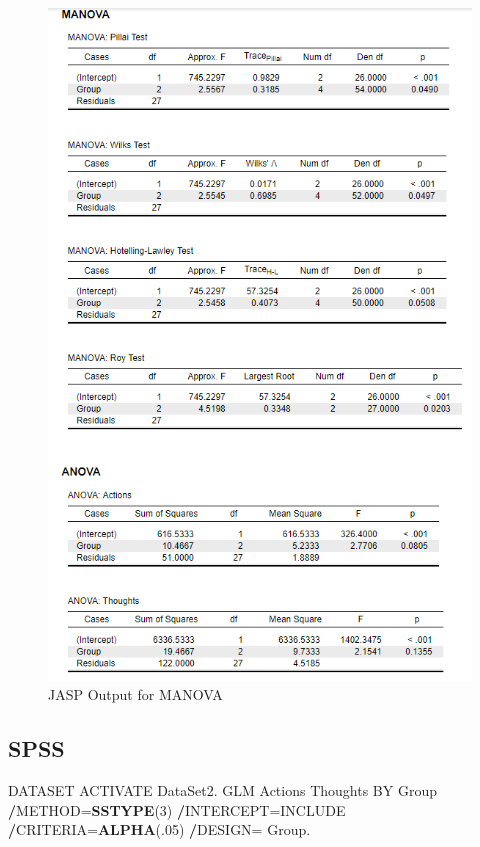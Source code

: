 \documentclass[
]{book}
\newenvironment{Shaded}{\begin{snugshade}}{\end{snugshade}}
\newcommand{\DecValTok}[1]{\textcolor[rgb]{0.00,0.00,0.81}{#1}}
\newcommand{\KeywordTok}[1]{\textcolor[rgb]{0.13,0.29,0.53}{\textbf{#1}}}
\newcommand{\NormalTok}[1]{#1}
\newcommand{\OperatorTok}[1]{\textcolor[rgb]{0.81,0.36,0.00}{\textbf{#1}}}
\newcommand{\StringTok}[1]{\textcolor[rgb]{0.31,0.60,0.02}{#1}}
\begin{document}
\begin{figure}[!h]
\includegraphics{Screenshots/MANOVA/MANOVAjasp} \caption{\label{fig:manovaJASP}JASP Output for MANOVA}\label{fig:manovaJASP}
\end{figure}

\hypertarget{spss-6}{%
\subsection{SPSS}\label{spss-6}}

\begin{Shaded}
\begin{Highlighting}[]
\NormalTok{DATASET ACTIVATE DataSet2.}
\NormalTok{GLM Actions Thoughts BY Group}
  \OperatorTok{/}\NormalTok{METHOD=}\KeywordTok{SSTYPE}\NormalTok{(}\DecValTok{3}\NormalTok{)}
  \OperatorTok{/}\NormalTok{INTERCEPT=INCLUDE}
  \OperatorTok{/}\NormalTok{CRITERIA=}\KeywordTok{ALPHA}\NormalTok{(.}\DecValTok{05}\NormalTok{)}
  \OperatorTok{/}\NormalTok{DESIGN=}\StringTok{ }\NormalTok{Group.}
\end{Highlighting}
\end{Shaded}
\end{document}
